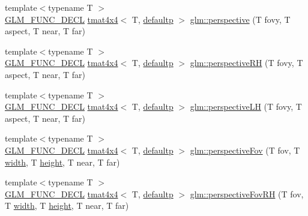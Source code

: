 \begin{DoxyCompactItemize}
\item 
{\footnotesize template$<$typename T $>$ }\\\mbox{\hyperlink{setup_8hpp_ab2d052de21a70539923e9bcbf6e83a51}{G\+L\+M\+\_\+\+F\+U\+N\+C\+\_\+\+D\+E\+CL}} \mbox{\hyperlink{structglm_1_1tmat4x4}{tmat4x4}}$<$ T, \mbox{\hyperlink{namespaceglm_a0f04f086094c747d227af4425893f545a9d21ccd8b5a009ec7eb7677befc3bf51}{defaultp}} $>$ \mbox{\hyperlink{group__gtc__matrix__transform_gac3613dcb6c6916465ad5b7ad5a786175}{glm\+::perspective}} (T fovy, T aspect, T near, T far)
\item 
{\footnotesize template$<$typename T $>$ }\\\mbox{\hyperlink{setup_8hpp_ab2d052de21a70539923e9bcbf6e83a51}{G\+L\+M\+\_\+\+F\+U\+N\+C\+\_\+\+D\+E\+CL}} \mbox{\hyperlink{structglm_1_1tmat4x4}{tmat4x4}}$<$ T, \mbox{\hyperlink{namespaceglm_a0f04f086094c747d227af4425893f545a9d21ccd8b5a009ec7eb7677befc3bf51}{defaultp}} $>$ \mbox{\hyperlink{group__gtc__matrix__transform_ga5a4fa9f8ffabb2294e48a18bf8fa2f5f}{glm\+::perspective\+RH}} (T fovy, T aspect, T near, T far)
\item 
{\footnotesize template$<$typename T $>$ }\\\mbox{\hyperlink{setup_8hpp_ab2d052de21a70539923e9bcbf6e83a51}{G\+L\+M\+\_\+\+F\+U\+N\+C\+\_\+\+D\+E\+CL}} \mbox{\hyperlink{structglm_1_1tmat4x4}{tmat4x4}}$<$ T, \mbox{\hyperlink{namespaceglm_a0f04f086094c747d227af4425893f545a9d21ccd8b5a009ec7eb7677befc3bf51}{defaultp}} $>$ \mbox{\hyperlink{group__gtc__matrix__transform_ga34048da27c559f1ac8e9550d169dd6f3}{glm\+::perspective\+LH}} (T fovy, T aspect, T near, T far)
\item 
{\footnotesize template$<$typename T $>$ }\\\mbox{\hyperlink{setup_8hpp_ab2d052de21a70539923e9bcbf6e83a51}{G\+L\+M\+\_\+\+F\+U\+N\+C\+\_\+\+D\+E\+CL}} \mbox{\hyperlink{structglm_1_1tmat4x4}{tmat4x4}}$<$ T, \mbox{\hyperlink{namespaceglm_a0f04f086094c747d227af4425893f545a9d21ccd8b5a009ec7eb7677befc3bf51}{defaultp}} $>$ \mbox{\hyperlink{group__gtc__matrix__transform_gae9146e2c550fc8646299e4b900238145}{glm\+::perspective\+Fov}} (T fov, T \mbox{\hyperlink{glad_8h_a09012ea95ebbbe1c032db7c68b54291e}{width}}, T \mbox{\hyperlink{glad_8h_a456943498a720df0f4b62bafa5dad93c}{height}}, T near, T far)
\item 
{\footnotesize template$<$typename T $>$ }\\\mbox{\hyperlink{setup_8hpp_ab2d052de21a70539923e9bcbf6e83a51}{G\+L\+M\+\_\+\+F\+U\+N\+C\+\_\+\+D\+E\+CL}} \mbox{\hyperlink{structglm_1_1tmat4x4}{tmat4x4}}$<$ T, \mbox{\hyperlink{namespaceglm_a0f04f086094c747d227af4425893f545a9d21ccd8b5a009ec7eb7677befc3bf51}{defaultp}} $>$ \mbox{\hyperlink{group__gtc__matrix__transform_ga07cd8df791bf90dcb782645fe0b21261}{glm\+::perspective\+Fov\+RH}} (T fov, T \mbox{\hyperlink{glad_8h_a09012ea95ebbbe1c032db7c68b54291e}{width}}, T \mbox{\hyperlink{glad_8h_a456943498a720df0f4b62bafa5dad93c}{height}}, T near, T far)

\end{DoxyCompactItemize}
